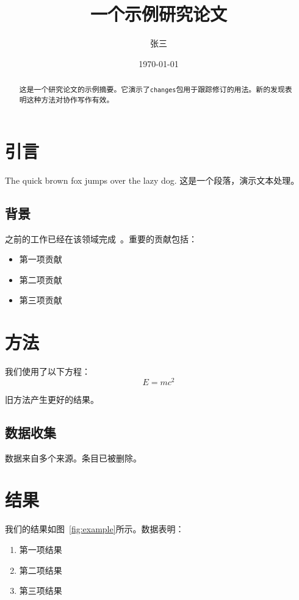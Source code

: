 \documentclass[12pt]{ctexart}
\title{一个示例研究论文}
\author{张三}
\date{\today}
\begin{document}
\maketitle

\begin{abstract}
这是一个研究论文的示例摘要。它演示了\texttt{changes}包用于跟踪修订的用法。新的发现表明这种方法对协作写作有效。
\end{abstract}

\section{引言}
\label{sec:intro}

The quick brown fox jumps over the lazy dog. 这是一个段落，演示文本处理。

\subsection{背景}
\label{subsec:background}

之前的工作已经在该领域完成~\cite{ref2021}。重要的贡献包括：
\begin{itemize}
    \item 第一项贡献
    \item 第二项贡献
    \item 第三项贡献
\end{itemize}

\section{方法}
\label{sec:method}

我们使用了以下方程：
\begin{equation}
    E = mc^2
    \label{eq:energy}
\end{equation}

旧方法产生更好的结果。

\subsection{数据收集}
数据来自多个来源。条目已被删除。

\section{结果}
\label{sec:results}

我们的结果如图~\ref{fig:example}所示。数据表明：
\begin{enumerate}
    \item 第一项结果
    \item 第二项结果
    \item 第三项结果
\end{enumerate}
\end{document}
